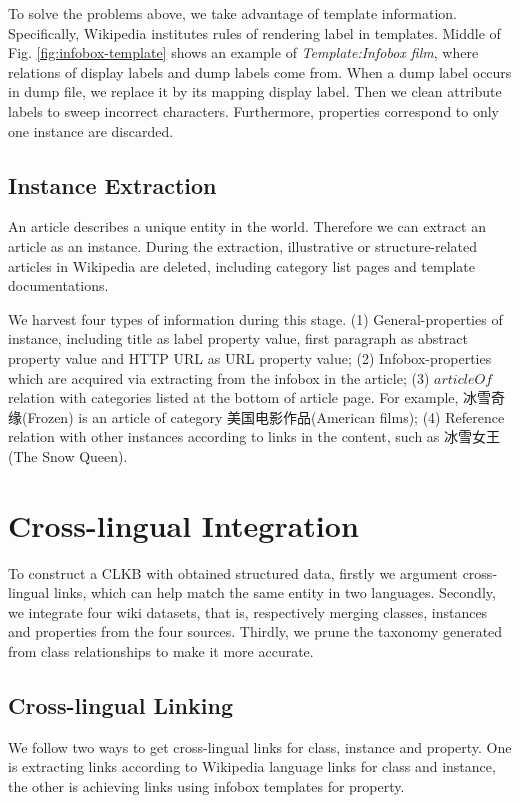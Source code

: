 \documentclass[runningheads,a4paper]{llncs}
\begin{document}
To solve the problems above, we take advantage of template information. Specifically, Wikipedia institutes rules of rendering label in templates. Middle of Fig. \ref{fig:infobox-template} shows an example of \emph{Template:Infobox film}, where relations of display labels and dump labels come from. When a dump label occurs in dump file, we replace it by its mapping display label. Then we clean attribute labels to sweep incorrect characters. Furthermore, properties correspond to only one instance are discarded.

\subsection{Instance Extraction}
\label{sec:ie}
An article describes a unique entity in the world. Therefore we can extract an article as an instance. During the extraction, illustrative or structure-related articles in Wikipedia are deleted, including category list pages and template documentations.

We harvest four types of information during this stage. (1) General-properties of instance, including title as label property value, first paragraph as abstract property value and HTTP URL as URL property value; (2) Infobox-properties which are acquired via extracting from the infobox in the article; (3) $articleOf$ relation with categories listed at the bottom of article page. For example, 冰雪奇缘(Frozen) is an article of category 美国电影作品(American films); (4) Reference relation with other instances according to links in the content, such as 冰雪女王(The Snow Queen).

\section{Cross-lingual Integration}
\label{sec:cli}

To construct a CLKB with obtained structured data, firstly we argument cross-lingual links, which can help match the same entity in two languages. Secondly, we integrate four wiki datasets, that is, respectively merging classes, instances and properties from the four sources. Thirdly, we prune the taxonomy generated from class relationships to make it more accurate.

\subsection{Cross-lingual Linking}
We follow two ways to get cross-lingual links for class, instance and property. One is extracting links according to Wikipedia language links for class and instance, the other is achieving links using infobox templates for property. 
\end{document}
